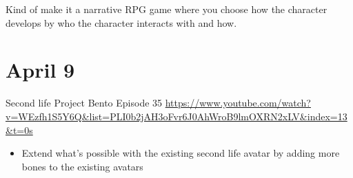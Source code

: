 \documentclass{article}
\begin{document}
Kind of make it a narrative RPG game where  you choose how the character develops by who the character interacts with and how.

\section{April 9}
Second life
Project Bento Episode 35
\url{https://www.youtube.com/watch?v=WEzfh1S5Y6Q&list=PLI0b2jAH3oFvr6J0AhWroB9lmOXRN2xLV&index=13&t=0s}
\begin{itemize}
 \item Extend what's possible with the existing second life avatar by adding more bones to the existing avatars
\end{itemize}
\end{document}
